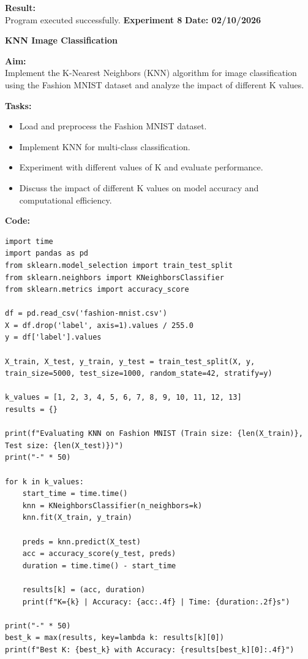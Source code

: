 \documentclass[12pt, a4paper]{article}
\begin{document}
\vspace{\baselineskip}

\noindent \textbf{Result:}\\
Program executed successfully.
\newpage
\noindent \textbf{Experiment 8} \hfill \textbf{Date: 02/10/2026}\\
\begin{center} \Large \textbf{KNN Image Classification} \end{center}
\textbf{Aim:}\\
Implement the K-Nearest Neighbors (KNN) algorithm for image classification using the Fashion MNIST dataset and analyze the impact of different K values.

\vspace{\baselineskip}
\noindent \textbf{Tasks:}\\
\vspace{-0.5\baselineskip}
\begin{itemize}[nosep]
    \item Load and preprocess the Fashion MNIST dataset.
    \item Implement KNN for multi-class classification.
    \item Experiment with different values of K and evaluate performance.
    \item Discuss the impact of different K values on model accuracy and computational efficiency.
\end{itemize}

\vspace{\baselineskip}
\noindent \textbf{Code:}\\
\begin{lstlisting}
import time
import pandas as pd
from sklearn.model_selection import train_test_split
from sklearn.neighbors import KNeighborsClassifier
from sklearn.metrics import accuracy_score

df = pd.read_csv('fashion-mnist.csv')
X = df.drop('label', axis=1).values / 255.0
y = df['label'].values

X_train, X_test, y_train, y_test = train_test_split(X, y, train_size=5000, test_size=1000, random_state=42, stratify=y)

k_values = [1, 2, 3, 4, 5, 6, 7, 8, 9, 10, 11, 12, 13]
results = {}

print(f"Evaluating KNN on Fashion MNIST (Train size: {len(X_train)}, Test size: {len(X_test)})")
print("-" * 50)

for k in k_values:
    start_time = time.time()
    knn = KNeighborsClassifier(n_neighbors=k)
    knn.fit(X_train, y_train)
    
    preds = knn.predict(X_test)
    acc = accuracy_score(y_test, preds)
    duration = time.time() - start_time
    
    results[k] = (acc, duration)
    print(f"K={k} | Accuracy: {acc:.4f} | Time: {duration:.2f}s")

print("-" * 50)
best_k = max(results, key=lambda k: results[k][0])
print(f"Best K: {best_k} with Accuracy: {results[best_k][0]:.4f}")
\end{lstlisting}
\end{document}
